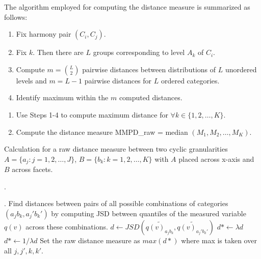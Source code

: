 \documentclass[
]{article}
\begin{document}
The algorithm employed for computing the distance measure is summarized as follows:

\begin{enumerate}
\def\labelenumi{\arabic{enumi}.}
\item
  Fix harmony pair \((C_i, C_j)\).
\item
  Fix \(k\). Then there are \(L\) groups corresponding to level \(A_k\) of \(C_i\).
\item
  Compute \(m = \binom{L}{2}\) pairwise distances between distributions of \(L\) unordered levels and \(m = L-1\) pairwise distances for \(L\) ordered categories.
\item
  Identify maximum within the \(m\) computed distances.
\end{enumerate}

\begin{enumerate}
\def\labelenumi{\arabic{enumi}.}
\setcounter{enumi}{4}
\item
  Use Steps 1-4 to compute maximum distance for \(\forall k \in \{1, 2, \ldots, K\}\).
\item
  Compute the distance measure MMPD\_raw = median \((M_1, M_2, \dots, M_K)\).
\end{enumerate}

\begin{algorithm}[!thb]
    \caption{Calculation for a raw distance measure between two cyclic granularities $A = \{ a_j: j = 1, 2, \dots, J\}$, $B = \{ b_k: k = 1, 2, \dots, K\}$ with $A$ placed across x-axis and $B$ across facets.}\label{alg:scoreopt}.
    \begin{algorithmic}[1]
        .
        \State Find distances between pairs of all possible combinations of categories $(a_jb_k,a_j'b_k')$ by computing JSD between quantiles of the measured variable $q(v)$ across these combinations.
        \State $d \gets JSD(\tilde{q(v)_{a_{j}b_{k}}},\tilde{q(v)_{a_{j}'b_{k}'}})$
        \State $d* \gets \lambda d$  
        \Else
        \State $d* \gets 1/\lambda d $ 
        \EndFor
        \State Set the raw distance measure as $max(d*)$ where max is taken over all $j, j', k, k'$.

        \EndProcedure
    \end{algorithmic}
\end{algorithm}
\end{document}
